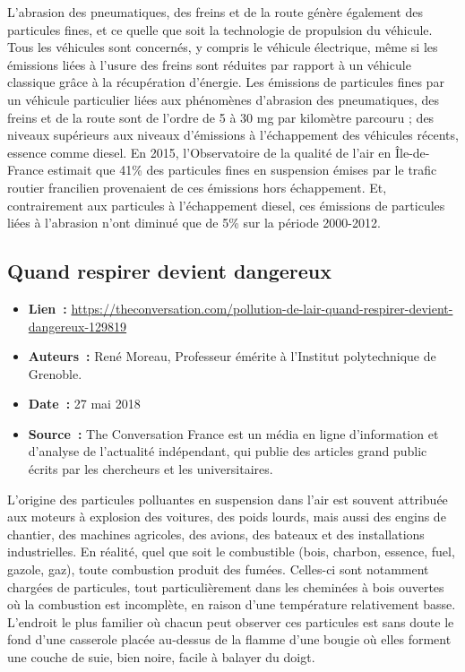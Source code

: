 \documentclass[8pt]{article}
\begin{document}
L’abrasion des pneumatiques, des freins et de la route génère également des particules fines, et ce quelle que soit la technologie de propulsion du véhicule.
Tous les véhicules sont concernés, y compris le véhicule électrique, même si les émissions liées à l’usure des freins sont réduites par rapport à un véhicule classique grâce à la récupération d’énergie.
Les émissions de particules fines par un véhicule particulier liées aux phénomènes d’abrasion des pneumatiques, des freins et de la route sont de l’ordre de 5 à 30 mg par kilomètre parcouru ; des niveaux supérieurs aux niveaux d’émissions à l’échappement des véhicules récents, essence comme diesel.
En 2015, l’Observatoire de la qualité de l’air en Île-de-France estimait que 41\% des particules fines en suspension émises par le trafic routier francilien provenaient de ces émissions hors échappement. Et, contrairement aux particules à l’échappement diesel, ces émissions de particules liées à l’abrasion n’ont diminué que de 5\% sur la période 2000-2012.

\newpage
\subsection{Quand respirer devient dangereux}
\label{sec:converstion_air}

\begin{itemize}
	\item \textbf{Lien~: } \url{https://theconversation.com/pollution-de-lair-quand-respirer-devient-dangereux-129819}
	\item \textbf{Auteurs~: } René Moreau,
	Professeur émérite à l'Institut polytechnique de Grenoble.
	\item \textbf{Date~: } 27 mai 2018
	\item \textbf{Source~: } The Conversation France est un média en ligne d'information et d'analyse de l'actualité indépendant, qui publie des articles grand public écrits par les chercheurs et les universitaires. 
\end{itemize}

L’origine des particules polluantes en suspension dans l’air est souvent attribuée aux moteurs à explosion des voitures, des poids lourds, mais aussi des engins de chantier, des machines agricoles, des avions, des bateaux et des installations industrielles.
En réalité, quel que soit le combustible (bois, charbon, essence, fuel, gazole, gaz), toute combustion produit des fumées. Celles-ci sont notamment chargées de particules, tout particulièrement dans les cheminées à bois ouvertes où la combustion est incomplète, en raison d’une température relativement basse. L’endroit le plus familier où chacun peut observer ces particules est sans doute le fond d’une casserole placée au-dessus de la flamme d’une bougie où elles forment une couche de suie, bien noire, facile à balayer du doigt.\\
\end{document}
